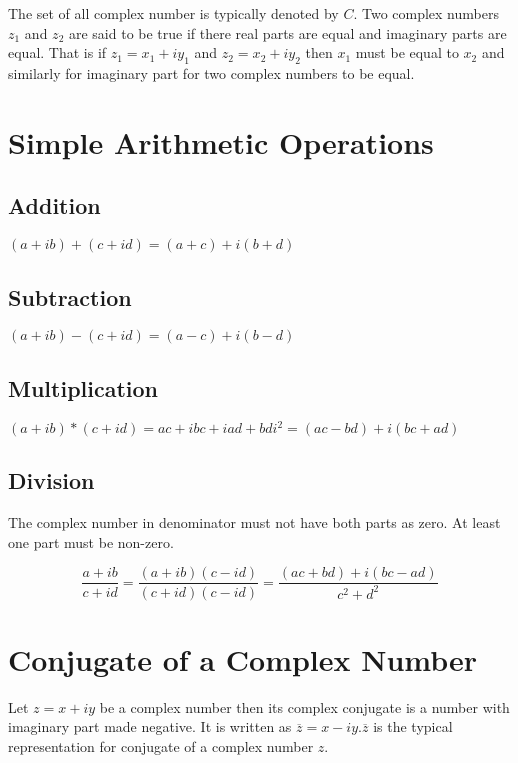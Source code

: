 The set of all complex number is typically denoted by $C$. Two complex numbers $z_1$ and $z_2$ are said to be true if there real
parts are equal and imaginary parts are equal. That is if $z_1=x_1+iy_1$ and $z_2=x_2+iy_2$ then $x_1$ must be equal to $x_2$ and
similarly for imaginary part for two complex numbers to be equal.

\section{Simple Arithmetic Operations}
\subsection{Addition}
$(a + ib) + (c + id) = (a + c) + i(b + d)$
\subsection{Subtraction}
$(a + ib) - (c + id) = (a - c) + i(b - d)$
\subsection{Multiplication}
$(a + ib) * (c + id) = ac + ibc + iad + bdi^2 = (ac - bd) +i(bc + ad)$
\subsection{Division}
The complex number in denominator must not have both parts as zero. At least one part must be non-zero.

$$\frac{a + ib}{c + id} = \frac{(a + ib)(c - id)}{(c + id)(c -id)} = \frac{(ac + bd) + i(bc -ad)}{c^2+d^2}$$

\section{Conjugate of a Complex Number}
Let $z = x + iy$ be a complex number then its complex conjugate is a number with imaginary part made negative. It is written as
$\overline{z} = x - iy. \overline{z}$ is the typical representation for conjugate of a complex number $z$.

